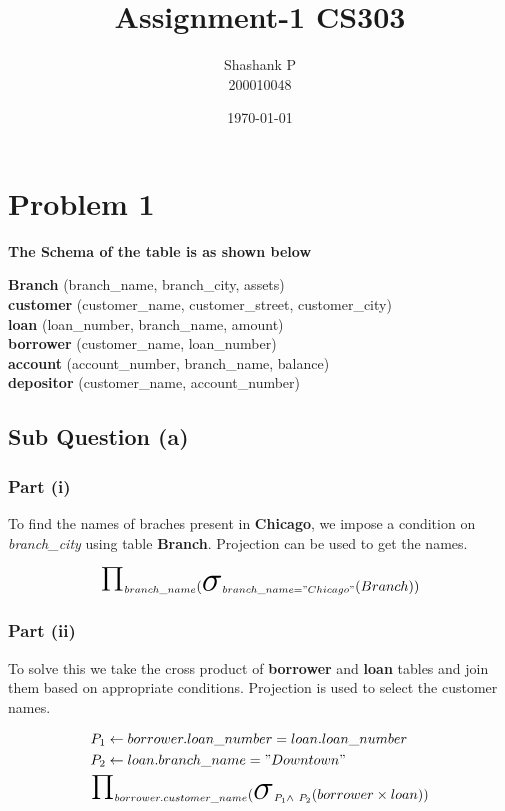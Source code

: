 \documentclass{article}
\title{Assignment-1 CS303}
\author{Shashank P \\ 200010048}
\date{\today}
\newcommand{\bigsigma}{\makebox{\Huge\ensuremath{\sigma}}}
\newcommand{\bigpi}{\makebox{\Huge\ensuremath{\Pi}}}
\begin{document}
\maketitle

\section{Problem 1}
\textbf{The Schema of the table is as shown below}
\begin{center}
    \textbf{Branch} (branch\_name, branch\_city, assets) \\ 
    \textbf{customer} (customer\_name, customer\_street, customer\_city) \\ 
    \textbf{loan} (loan\_number, branch\_name, amount) \\ 
    \textbf{borrower} (customer\_name, loan\_number) \\ 
    \textbf{account} (account\_number, branch\_name, balance) \\ 
    \textbf{depositor} (customer\_name, account\_number) 
\end{center}
\subsection{Sub Question (a)}
\subsubsection{Part (i)}
\hspace{\parindent} To find the names of braches present in \textbf{Chicago}, we
impose a condition on \textit{branch\_city} using table \textbf{Branch}. Projection
can be used to get the names.

\begin{equation}
  \Large \bigpi_{branch\_name} (\bigsigma_{branch\_name="Chicago"}(Branch))
\end{equation}

\subsubsection{Part (ii)}
\hspace{\parindent} To solve this we take the cross product of 
\textbf{borrower} and \textbf{loan} tables and join them based on
appropriate conditions. Projection is used to select the customer names.


\begin{equation}
    \begin{split}
       & P_1 \leftarrow  borrower.loan\_number = loan.loan\_number \\
       & P_2 \leftarrow  loan.branch\_name = "Downtown" \\
       & \bigpi_{borrower.customer\_name}  (\bigsigma_{P_1 \wedge \ P_2}(borrower \times loan))
    \end{split}
\end{equation}
 
\end{document}

